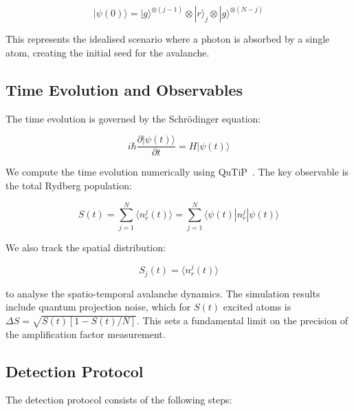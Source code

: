 \begin{equation}
    |\psi(0)\rangle = |g\rangle^{\otimes (j-1)} \otimes |r\rangle_j \otimes |g\rangle^{\otimes (N-j)}
    \label{eq:initial_state}
\end{equation}

This represents the idealised scenario where a photon is absorbed by a single atom, creating the initial seed for the avalanche.

\subsection*{Time Evolution and Observables}

The time evolution is governed by the Schrödinger equation:

\begin{equation}
    i\hbar \frac{\partial |\psi(t)\rangle}{\partial t} = H |\psi(t)\rangle
    \label{eq:schrodinger}
\end{equation}

We compute the time evolution numerically using QuTiP~\cite{Johansson2013}. The key observable is the total Rydberg population:

\begin{equation}
    S(t) = \sum_{j=1}^{N} \langle n_r^j(t) \rangle = \sum_{j=1}^{N} \langle \psi(t) | n_r^j | \psi(t) \rangle
    \label{eq:signal_observable}
\end{equation}

We also track the spatial distribution:

\begin{equation}
    S_j(t) = \langle n_r^j(t) \rangle
    \label{eq:spatial_distribution}
\end{equation}

to analyse the spatio-temporal avalanche dynamics.
The simulation results include quantum projection noise, which for $S(t)$ excited atoms is $\Delta S = \sqrt{S(t)[1-S(t)/N]}$. This sets a fundamental limit on the precision of the amplification factor measurement.

\subsection*{Detection Protocol}

The detection protocol consists of the following steps:

